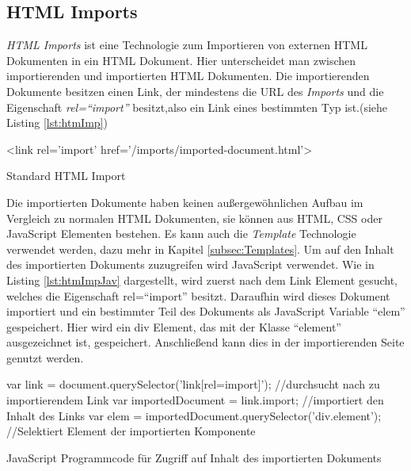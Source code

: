 \documentclass[12pt, paper=a4, bibtotoc, toc=listof, headsepline=true]{scrreprt}
\begin{document}
		\subsection{HTML Imports}
		\emph{\ac{HTML} Imports} ist eine Technologie zum Importieren von externen \ac{HTML} Dokumenten in ein \ac{HTML} Dokument. Hier unterscheidet man zwischen importierenden und importierten \ac{HTML} Dokumenten. Die importierenden Dokumente besitzen einen Link, der mindestens die \ac{URL} des \emph{Imports} und die Eigenschaft \emph{rel=\enquote{import}} besitzt,also ein Link eines bestimmten Typ ist\cite{Glazkov2016}.(siehe Listing \ref{lst:htmImp}) 
		\begin{listing}
			\begin{HTMLcode*}{}
 <link rel='import' href='/imports/imported-document.html'>
				\end{HTMLcode*}
			\caption{Standard HTML Import}
			\label{lst:htmImp}
		\end{listing}
		Die importierten Dokumente haben keinen außergewöhnlichen Aufbau im Vergleich zu normalen \ac{HTML} Dokumenten, sie können aus \ac{HTML}, \ac{CSS} oder JavaScript Elementen bestehen. Es kann auch die \emph{Template} Technologie verwendet werden, dazu mehr in Kapitel \ref{subsec:Templates}.
		Um auf den Inhalt des importierten Dokuments zuzugreifen wird JavaScript verwendet. Wie in Listing \ref{lst:htmImpJav} dargestellt, wird zuerst nach dem Link Element gesucht, welches die Eigenschaft rel=\enquote{import} besitzt. Daraufhin wird dieses Dokument importiert und ein bestimmter Teil des Dokuments als JavaScript Variable \enquote{elem} gespeichert. Hier wird ein div Element, das mit der Klasse \enquote{element} ausgezeichnet ist, gespeichert. Anschließend kann dies in der importierenden Seite genutzt werden. 
		\begin{listing}
			\begin{JavaScriptcode*}{}
var link = document.querySelector('link[rel=import]'); //durchsucht nach zu importierendem Link
var importedDocument = link.import; //importiert den Inhalt des Links
var elem = importedDocument.querySelector('div.element');  //Selektiert Element der importierten Komponente
			\end{JavaScriptcode*}
			\caption[Zugriff auf importiertes Dokument]{JavaScript Programmcode für Zugriff auf Inhalt des importierten Dokuments}
			\label{lst:htmImpJav}
		\end{listing} 
\end{document}
